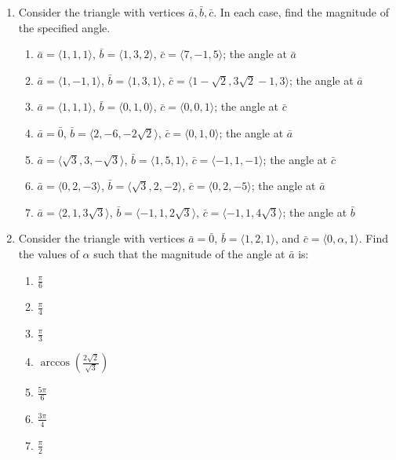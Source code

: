 \begin{exercisebox}
\begin{enumerate}[series=AngleEX]
  \item Consider the triangle with vertices $\bar{a}, \bar{b}, \bar{c}$. In each case, find the magnitude of the specified angle.
  \begin{enumerate}
    \item $\bar{a} = \langle 1,1,1 \rangle$, $\bar{b} = \langle 1,3,2 \rangle$, $\bar{c}= \langle 7,-1,5 \rangle$; the angle at $\bar{a}$
    \item $\bar{a} = \langle 1,-1,1 \rangle$, $\bar{b} = \langle 1,3,1 \rangle$, $\bar{c}= \langle 1 - \sqrt{2}, 3\sqrt{2} - 1, 3 \rangle$; the angle at $\bar{a}$
    \item $\bar{a} = \langle 1,1,1 \rangle$, $\bar{b} = \langle 0,1,0 \rangle$, $\bar{c}= \langle 0,0,1 \rangle$; the angle at $\bar{c}$
    \item $\bar{a} = \bar{0}$, $\bar{b} = \langle 2, -6, -2\sqrt{2} \rangle$, $\bar{c}= \langle 0, 1, 0 \rangle$; the angle at $\bar{a}$
    \item $\bar{a} = \langle \sqrt{3}, 3, -\sqrt{3} \rangle$, $\bar{b} = \langle 1, 5, 1 \rangle$, $\bar{c} = \langle -1, 1, -1 \rangle$; the angle at $\bar{c}$
    \item $\bar{a} = \langle 0, 2, -3 \rangle$, $\bar{b} = \langle \sqrt{3}, 2, -2 \rangle$, $\bar{c}= \langle 0, 2, -5 \rangle$; the angle at $\bar{a}$
    \item $\bar{a} = \langle 2, 1, 3\sqrt{3} \rangle$, $\bar{b} = \langle -1, 1, 2\sqrt{3} \rangle$, $\bar{c}= \langle -1, 1, 4\sqrt{3} \rangle$; the angle at $\bar{b}$
  \end{enumerate}

  \item Consider the triangle with vertices $\bar{a} = \bar{0}$, $\bar{b} = \langle 1, 2, 1 \rangle$, and $\bar{c} = \langle 0, \alpha, 1 \rangle$. Find the values of $\alpha$ such that the magnitude of the angle at $\bar{a}$ is:
  \begin{multicols}{2}
  \begin{enumerate}
    \item $\frac{\pi}{6}$
    \item $\frac{\pi}{4}$
    \item $\frac{\pi}{3}$
    \item $\arccos\left( \frac{2\sqrt{2}}{\sqrt{3}} \right)$
    \item $\frac{5\pi}{6}$
    \item $\frac{3\pi}{4}$
    \item $\frac{\pi}{2}$
  \end{enumerate}
  \end{multicols}
  \end{enumerate}
\end{exercisebox}

